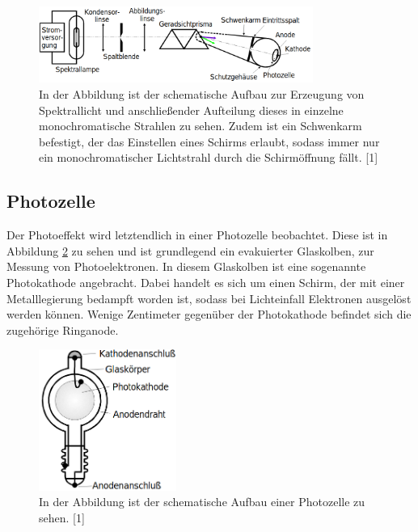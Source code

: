 \documentclass[titlepage = firstcover]{scrartcl}
\begin{document}
            \FloatBarrier

                \begin{figure}[h]
                  \centering
                  \includegraphics[width = 0.8\textwidth]{Bilder/Monolicht.png}
                  \caption{In der Abbildung ist der schematische Aufbau zur Erzeugung von Spektrallicht und anschließender Aufteilung dieses in einzelne monochromatische Strahlen zu sehen. Zudem ist ein Schwenkarm befestigt, der das Einstellen eines Schirms erlaubt, sodass immer nur ein monochromatischer Lichtstrahl durch die Schirmöffnung fällt. [1]}
                  \label{fig:MonoLicht}
                \end{figure}

            \FloatBarrier

        \subsection{Photozelle}
            Der Photoeffekt wird letztendlich in einer Photozelle beobachtet. Diese ist in Abbildung \ref{fig:Photozelle} zu sehen und ist grundlegend ein evakuierter Glaskolben, zur Messung von Photoelektronen. In 
            diesem Glaskolben ist eine sogenannte Photokathode angebracht. Dabei handelt es sich um einen Schirm, der mit einer Metalllegierung bedampft worden ist, sodass bei Lichteinfall Elektronen 
            ausgelöst werden können. Wenige Zentimeter gegenüber der Photokathode befindet sich die zugehörige Ringanode.

            \FloatBarrier

                \begin{figure}[h]
                  \centering
                  \includegraphics[width = 0.4\textwidth]{Bilder/Photozelle.png}
                  \caption{In der Abbildung ist der schematische Aufbau einer Photozelle zu sehen. [1]}
                  \label{fig:Photozelle}
                \end{figure}
\end{document}
